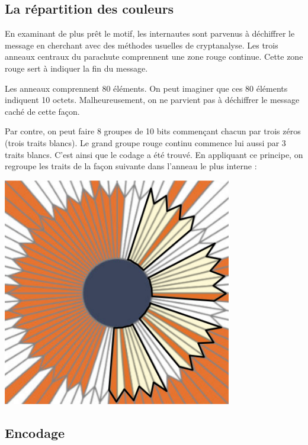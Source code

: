 \documentclass[a4paper,dvipsnames]{article}
\begin{document}
\subsection{La répartition des couleurs}

 En examinant de plus prêt le motif, les internautes sont parvenus à déchiffrer le message en cherchant avec des méthodes usuelles de cryptanalyse. Les trois anneaux centraux du parachute comprennent une zone rouge continue. Cette zone rouge sert à indiquer la fin du message.

\medskip

Les anneaux comprennent 80 éléments. On peut imaginer que ces 80 éléments indiquent 10 octets. Malheureusement, on ne parvient pas à déchiffrer le message caché de cette façon.

\medskip

Par contre, on peut faire 8 groupes de 10 bits commençant chacun par trois zéros (trois traits blancs). Le \og{}grand\fg{} groupe rouge continu commence lui aussi par 3 traits blancs. C'est ainsi que le codage a été trouvé. En appliquant ce principe, on regroupe les traits de la façon suivante dans l'anneau le plus interne :

\begin{center}
  \includegraphics[width=10cm]{img/motif-colorie.png}
\end{center}

\subsection{Encodage}
\end{document}
